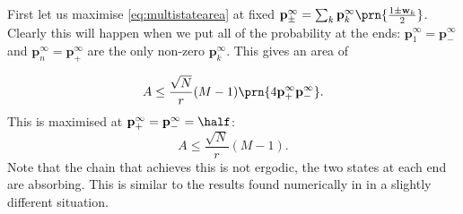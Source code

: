 \documentclass{article} %
\newcommand{\pr}{\mathbf{p}}
\newcommand{\eq}{\pr^\infty}
\newcommand{\w}{\mathbf{w}}
\begin{document}

First let us maximise \eqref{eq:multistatearea} at fixed $\eq_\pm = \sum_k \eq_k \prn{\frac{1\pm\w_k}{2}}$.
Clearly this will happen when we put all of the probability at the ends: $\eq_1=\eq_-$ and $\eq_n=\eq_+$ are the only non-zero $\eq_k$.
This gives an area of

%
\begin{equation}\label{eq:multistateextarea}
  A \leq \frac{\sqrt{N}}{r}(M-1)\prn{4\eq_+\eq_-}.
\end{equation}
%
This is maximised at $\eq_+=\eq_-=\half$:
%
\begin{equation}\label{eq:maxarea}
  A \leq \frac{\sqrt{N}}{r}(M-1).
\end{equation}
%
Note that the chain that achieves this is not ergodic, the two states at each end are absorbing. This is similar to the results found numerically in \cite{Barrett2008discrete} in a slightly different situation.







\end{document}
